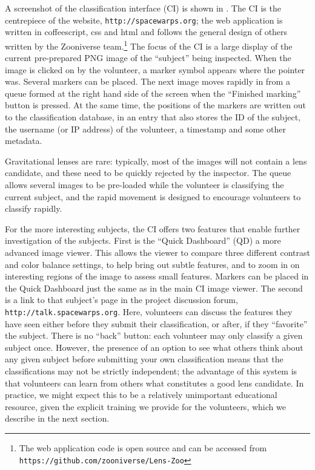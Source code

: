 \documentclass[useAMS,usenatbib,a4paper]{mn2e}
\begin{document}
A screenshot of the \sw classification interface (CI) is shown in
. The CI is the centrepiece of the \sw website,
\texttt{http://spacewarps.org}; the web application is written in
coffeescript, css and html and follows the general design of others written by
the Zooniverse team.\footnote{The \sw web application code is open source and
can be accessed from \texttt{https://github.com/zooniverse/Lens-Zoo}}  The
focus of the CI is a large display of the current pre-prepared PNG image of
the ``subject'' being inspected.   When the image is clicked on by the
volunteer, a marker symbol appears where the pointer was. Several markers can
be placed.  The next image moves rapidly in from a queue formed at the right
hand side of the screen when the ``Finished marking'' button is pressed. At
the same time, the positions of the markers are written out to the
classification database, in an entry that also stores the ID of the subject,
the username (or IP address) of the volunteer, a timestamp and some other
metadata. 

Gravitational lenses are rare: typically, most of the images will not contain
a lens candidate, and these need to be quickly rejected by the inspector. The
queue allows several images to be pre-loaded while the volunteer is
classifying the current subject, and the rapid movement is designed to
encourage volunteers to classify rapidly.

For the more interesting subjects, the CI offers two features that  enable
further investigation of the subjects. First is the ``Quick Dashboard'' (QD) a
more advanced image viewer. This allows the viewer to compare three different
contrast and color balance settings, to help bring out subtle features, and to
zoom in on interesting regions of the image to assess small features. Markers
can be placed in the Quick Dashboard just the same as in the main CI image
viewer. The second is a link to that subject's page in the project discussion
forum, \texttt{http://talk.spacewarps.org}. Here, volunteers can discuss the
features they have seen either before they submit their classification, or
after, if they ``favorite'' the subject. There is no ``back'' button: each
volunteer may only classify a given subject once. However, the presence of an
option to see what others think about any given subject before submitting your
own classification means that the classifications may not be  strictly
independent; the advantage of this system is that volunteers can learn from
others what constitutes a good lens candidate. In practice, we might expect
this to be a relatively unimportant educational resource, given the explicit
training we provide for the volunteers, which we describe in the next section.
\end{document}

